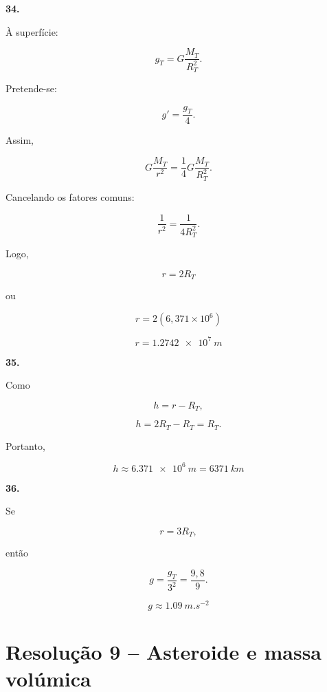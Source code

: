 \documentclass[11pt,a4paper]{article}
\begin{document}
	\begin{solucaobox}[Questões 34--36]
		
		\textbf{34.}
		
		À superfície:
		
		\[
		g_T=
		G\frac{M_T}{R_T^2}.
		\]
		
		Pretende-se:
		
		\[
		g'=\frac{g_T}{4}.
		\]
		
		Assim,
		
		\[
		G\frac{M_T}{r^2}
		=
		\frac14
		G\frac{M_T}{R_T^2}.
		\]
		
		Cancelando os fatores comuns:
		
		\[
		\frac1{r^2}
		=
		\frac1{4R_T^2}.
		\]
		
		Logo,
		
		\[
		\boxed{
			r=2R_T
		}
		\]
		
		ou
		
		\[
		r=
		2(6{,}371\times10^6)
		\]
		
		\[
		\boxed{
			r=
			\SI{1.2742e7}{m}
		}
		\]
		
		\vspace{3mm}
		
		\textbf{35.}
		
		Como
		
		\[
		h=r-R_T,
		\]
		
		\[
		h=2R_T-R_T=R_T.
		\]
		
		Portanto,
		
		\[
		\boxed{
			h\approx\SI{6.371e6}{m}
			=
			\SI{6371}{km}
		}
		\]
		
		\vspace{3mm}
		
		\textbf{36.}
		
		Se
		
		\[
		r=3R_T,
		\]
		
		então
		
		\[
		g=
		\frac{g_T}{3^2}
		=
		\frac{9{,}8}{9}.
		\]
		
		\[
		\boxed{
			g\approx\SI{1.09}{m.s^{-2}}
		}
		\]
		
	\end{solucaobox}
	
	\section*{Resolução 9 -- Asteroide e massa volúmica}
	
\end{document}
